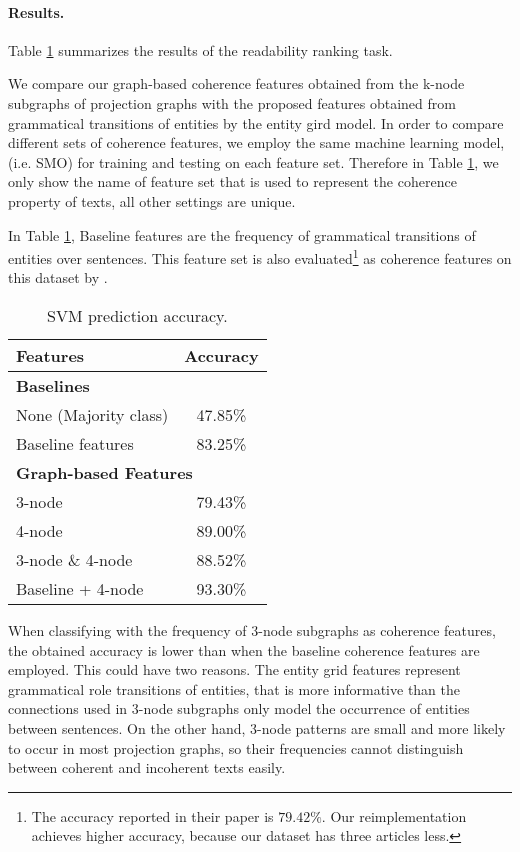 \paragraph{Results. }
%
Table \ref{table:classification_task} summarizes the results of the readability ranking task. 

We compare our graph-based coherence features obtained from the k-node subgraphs of projection graphs with the proposed features obtained from grammatical transitions of entities by the entity gird model. 
In order to compare different sets of coherence features, we employ the same machine learning model, (i.e. SMO) for training and testing on each feature set. 
Therefore in Table \ref{table:classification_task},  we only show the name of feature set that is used to represent the coherence property of texts, all other settings are unique. 

In Table \ref{table:classification_task}, Baseline features are the frequency of grammatical transitions of entities over sentences. 
This feature set is also evaluated\footnote{The accuracy reported in their paper is $79.42\%$. Our reimplementation achieves higher accuracy, because our dataset has three articles less.} as coherence features on this dataset by .

\begin{table}[!h]
\centering
\begin{small}
\begin{tabular}{@{}lc@{}}
\hline
\textbf{Features} & \textbf{Accuracy} \\\hline
\multicolumn{2}{l}{\textbf{Baselines}} \\
None (Majority class) & 47.85\% \\
Baseline features \cite{pitler08} & 83.25\% \\\hline
\multicolumn{2}{l}{\textbf{Graph-based Features}} \\
3-node & 79.43\% \\
4-node & 89.00\%  \\
3-node \& 4-node & 88.52\% \\
Baseline + 4-node & 93.30\% \\
\hline
\end{tabular}
\end{small}
\caption{SVM prediction accuracy.}
\label{table:classification_task}
\end{table}

When classifying with the frequency of 3-node subgraphs as coherence features, the obtained accuracy is lower than when the baseline coherence features are employed.  
This could have two reasons. 
The entity grid features represent grammatical role transitions of entities, that is more informative than the connections used in 3-node subgraphs only model the occurrence of entities between sentences. 
On the other hand, 3-node patterns are small and more likely to occur in most projection graphs, so their frequencies cannot distinguish between coherent and incoherent texts easily. 

